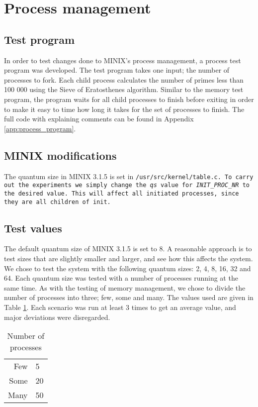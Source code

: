 \documentclass[11pt]{article}
\begin{document}
\section{Process management}
\subsection{Test program}
In order to test changes done to MINIX's process management, a process test program was developed. The test program takes one input; the number of processes to fork. Each child process calculates the number of primes less than 100 000 using the Sieve of Eratosthenes algorithm. Similar to the memory test program, the program waits for all child processes to finish before exiting in order to make it easy to time how long it takes for the set of processes to finish. The full code with explaining comments can be found in Appendix \ref{app:process_program}.

\subsection{MINIX modifications}
The quantum size in MINIX 3.1.5 is set in \tt/usr/src/kernel/table.c\normalfont. To carry out the experiments we simply change the \emph{qs} value for \emph{INIT\_PROC\_NR} to the desired value. This will affect all initiated processes, since they are all children of \tt init\normalfont.

\subsection{Test values}
The default quantum size of MINIX 3.1.5 is set to 8. A reasonable approach is to test sizes that are slightly smaller and larger, and see how this affects the system. We chose to test the system with the following quantum sizes: 2, 4, 8, 16, 32 and 64. Each quantum size was tested with a number of processes running at the same time. As with the testing of memory management, we chose to divide the number of processes into three; few, some and many. The values used are given in Table \ref{tab:number_of_processes_testing_quantum}. Each scenario was run at least 3 times to get an average value, and major deviations were disregarded.

\begin{table}[h!]
	\begin{center}
		\begin{tabular}{ r | l }
		Few & 5\\
		Some & 20\\
		Many & 50
		\end{tabular}
	  
	  \caption{Number of processes}
	  \label{tab:number_of_processes_testing_quantum}
	\end{center}
\end{table}
\end{document}
